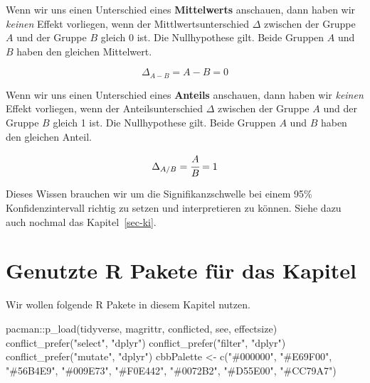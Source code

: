 \documentclass[
  letterpaper,
]{scrbook}
\newenvironment{Shaded}{\begin{snugshade}}{\end{snugshade}}
\newcommand{\FunctionTok}[1]{\textcolor[rgb]{0.28,0.35,0.67}{#1}}
\newcommand{\NormalTok}[1]{\textcolor[rgb]{0.00,0.23,0.31}{#1}}
\newcommand{\OtherTok}[1]{\textcolor[rgb]{0.00,0.23,0.31}{#1}}
\newcommand{\SpecialCharTok}[1]{\textcolor[rgb]{0.37,0.37,0.37}{#1}}
\newcommand{\StringTok}[1]{\textcolor[rgb]{0.13,0.47,0.30}{#1}}
\begin{document}
\begin{tcolorbox}[enhanced jigsaw, coltitle=black, titlerule=0mm, bottomrule=.15mm, opacityback=0, opacitybacktitle=0.6, leftrule=.75mm, title=\textcolor{quarto-callout-tip-color}{\faLightbulb}\hspace{0.5em}{Effektschätzer}, toprule=.15mm, bottomtitle=1mm, toptitle=1mm, left=2mm, breakable, arc=.35mm, colback=white, rightrule=.15mm, colbacktitle=quarto-callout-tip-color!10!white, colframe=quarto-callout-tip-color-frame]
Wenn wir uns einen Unterschied eines \textbf{Mittelwerts} anschauen,
dann haben wir \emph{keinen} Effekt vorliegen, wenn der
Mittlwertsunterschied \(\Delta\) zwischen der Gruppe \(A\) und der
Gruppe \(B\) gleich 0 ist. Die Nullhypothese gilt. Beide Gruppen \(A\)
und \(B\) haben den gleichen Mittelwert.

\[
\Delta_{A-B} = A - B = 0
\]

Wenn wir uns einen Unterschied eines \textbf{Anteils} anschauen, dann
haben wir \emph{keinen} Effekt vorliegen, wenn der Anteilsunterschied
\(\Delta\) zwischen der Gruppe \(A\) und der Gruppe \(B\) gleich 1 ist.
Die Nullhypothese gilt. Beide Gruppen \(A\) und \(B\) haben den gleichen
Anteil.

\[
\Delta_{A/B} = \cfrac{A}{B} = 1
\]

Dieses Wissen brauchen wir um die Signifikanzschwelle bei einem 95\%
Konfidenzintervall richtig zu setzen und interpretieren zu können. Siehe
dazu auch nochmal das Kapitel~\ref{sec-ki}.
\end{tcolorbox}

\hypertarget{genutzte-r-pakete-fuxfcr-das-kapitel-5}{%
\section{Genutzte R Pakete für das
Kapitel}\label{genutzte-r-pakete-fuxfcr-das-kapitel-5}}

Wir wollen folgende R Pakete in diesem Kapitel nutzen.

\begin{Shaded}
\begin{Highlighting}[]
\NormalTok{pacman}\SpecialCharTok{::}\FunctionTok{p\_load}\NormalTok{(tidyverse, magrittr, conflicted, see, effectsize)}
\FunctionTok{conflict\_prefer}\NormalTok{(}\StringTok{"select"}\NormalTok{, }\StringTok{"dplyr"}\NormalTok{)}
\FunctionTok{conflict\_prefer}\NormalTok{(}\StringTok{"filter"}\NormalTok{, }\StringTok{"dplyr"}\NormalTok{)}
\FunctionTok{conflict\_prefer}\NormalTok{(}\StringTok{"mutate"}\NormalTok{, }\StringTok{"dplyr"}\NormalTok{)}
\NormalTok{cbbPalette }\OtherTok{\textless{}{-}} \FunctionTok{c}\NormalTok{(}\StringTok{"\#000000"}\NormalTok{, }\StringTok{"\#E69F00"}\NormalTok{, }\StringTok{"\#56B4E9"}\NormalTok{, }\StringTok{"\#009E73"}\NormalTok{, }
                \StringTok{"\#F0E442"}\NormalTok{, }\StringTok{"\#0072B2"}\NormalTok{, }\StringTok{"\#D55E00"}\NormalTok{, }\StringTok{"\#CC79A7"}\NormalTok{)}
\end{Highlighting}
\end{Shaded}
\end{document}
